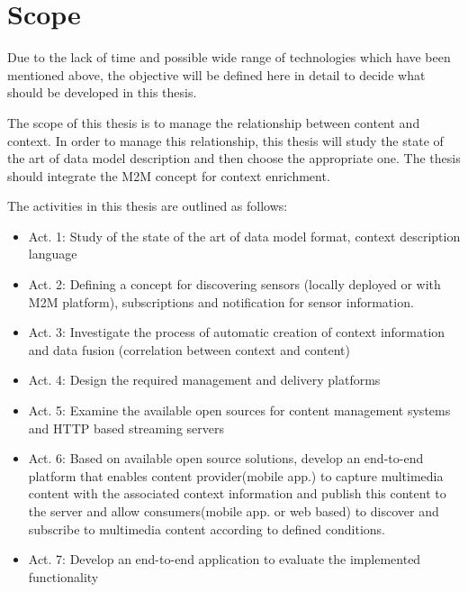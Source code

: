 \section{Scope\label{sec:scope}}

Due to the lack of time and possible wide range of technologies which have been mentioned above, the objective will be defined here in detail to decide what should be developed in this thesis.

The scope of this thesis is to manage the relationship between content and context. In order to manage this relationship, this thesis will study the state of the art of data model description and then choose the appropriate one. The thesis should integrate the \ac{M2M} concept for context enrichment.


The activities in this thesis are outlined as follows:
	\begin{itemize}
		\item Act. 1: Study of the state of the art of data model format, context description language
				\vspace{-0.1in} 
		\item Act. 2: Defining a concept for discovering sensors (locally deployed or with \ac{M2M} platform), subscriptions and notification for sensor information.
				\vspace{-0.1in} 
		\item Act. 3: Investigate the process of automatic creation of context information and data fusion (correlation between context and content)
				\vspace{-0.1in} 		
		\item Act. 4: Design the required management and delivery platforms 
    			\vspace{-0.1in} 
		\item Act. 5: Examine the available open sources for content management systems and \ac{HTTP} based streaming servers
 				\vspace{-0.1in} 
		\item Act. 6: Based on available open source solutions, develop an end-to-end platform that enables content provider(mobile app.) to capture multimedia content with the associated context information and publish this content to the server and allow consumers(mobile app. or web based) to discover and subscribe to multimedia content according to defined conditions. 
    			\vspace{-0.1in} 
    	\item Act. 7: Develop an end-to-end application to evaluate the implemented functionality
    \end{itemize}

